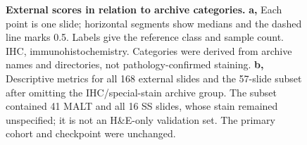 \begin{figure}[tbp]\centering
{}
\caption{\textbf{External scores in relation to archive categories.} \textbf{a,} Each point is one slide; horizontal segments show medians and the dashed line marks 0.5. Labels give the reference class and sample count. IHC, immunohistochemistry. Categories were derived from archive names and directories, not pathology-confirmed staining. \textbf{b,} Descriptive metrics for all 168 external slides and the 57-slide subset after omitting the IHC/special-stain archive group. The subset contained 41 MALT and all 16 SS slides, whose stain remained unspecified; it is not an H\&E-only validation set. The primary cohort and checkpoint were unchanged.}\label{fig:material}
\end{figure}
